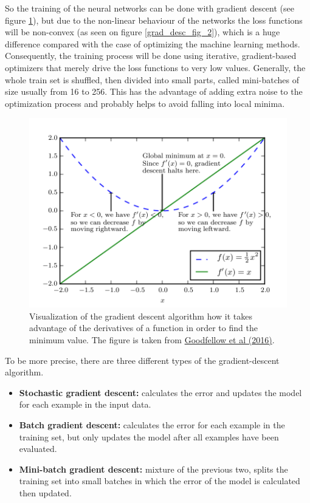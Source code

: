 \documentclass[12pt]{article}
\theoremstyle{plain}
\begin{document}
So the training of the neural networks can be done with gradient descent (see figure \ref{grad_desc_fig_1}), but due to the non-linear behaviour of the networks the loss functions will be non-convex (as seen on figure \ref{grad_desc_fig_2}), which is a huge difference compared with the case of optimizing the machine learning methods. Consequently, the training process will be done using iterative, gradient-based optimizers that merely drive the loss functions to very low values. Generally, the whole train set is shuffled, then divided into small parts, called mini-batches of size usually from 16 to 256. This has the advantage of adding extra noise to the optimization process and probably helps to avoid falling into local minima. 

\begin{figure}[h!]
    \centering
	\includegraphics[width=.7\linewidth]{media/grad_desc_fig1.png}
	\caption{Visualization of the gradient descent algorithm how it takes advantage of the derivatives of a function in order to find the minimum value. The figure is taken from \protect\hyperlink{Deeplea_Goodfellow}{Goodfellow et al (2016)}.}
	\label{grad_desc_fig_1}
\end{figure}

To be more precise, there are three different types of the gradient-descent algorithm.

\begin{itemize}
	\item \textbf{Stochastic gradient descent:} calculates the error and updates the model for each example in the input data.
	\item \textbf{Batch gradient descent:} calculates the error for each example in the training set, but only updates the model after all examples have been evaluated.
	\item \textbf{Mini-batch gradient descent:} mixture of the previous two, splits the training set into small batches in which the error of the model is calculated then updated.
\end{itemize}
\end{document}
